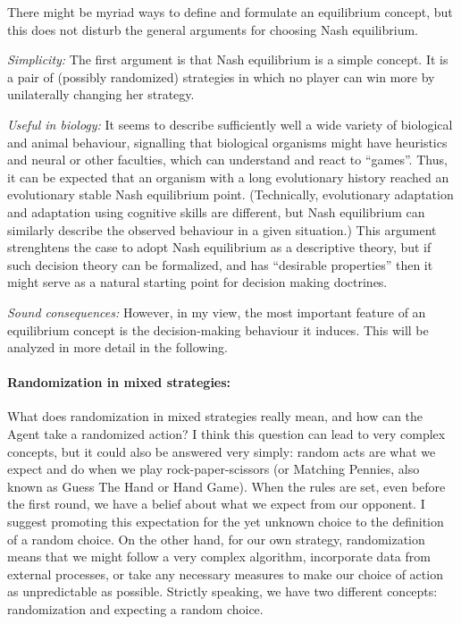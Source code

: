 \documentclass{article}
\begin{document}
There might be myriad ways to define and formulate an equilibrium concept, but this does not disturb the general arguments for choosing Nash equilibrium.

{\it Simplicity:}
The first argument is that Nash equilibrium is a simple concept. It is a pair of (possibly randomized) strategies in which no player can win more by unilaterally changing her strategy.

{\it Useful in biology:}
It seems to describe sufficiently well a wide variety of biological and animal behaviour, signalling that biological organisms might have heuristics and neural or other faculties, which can understand and react to ``games''. Thus, it can be expected that an organism with a long evolutionary history reached an evolutionary stable Nash equilibrium point. (Technically, evolutionary adaptation and adaptation using cognitive skills are different, but Nash equilibrium can similarly describe the observed behaviour in a given situation.)
This argument strenghtens the case to adopt Nash equilibrium as a descriptive theory, but if such decision theory can be formalized, and has ``desirable properties'' then it might serve as a natural starting point for decision making doctrines.

{\it Sound consequences:}
However, in my view, the most important feature of an equilibrium concept is the decision-making behaviour it induces. This will be analyzed in more detail in the following.

\paragraph{Randomization in mixed strategies:}
What does randomization in mixed strategies really mean, and how can the Agent take a randomized action?
I think this question can lead to very complex concepts, but it could also be answered very simply: random acts are what we expect and do when we play rock-paper-scissors (or Matching Pennies, also known as Guess The Hand or Hand Game).
When the rules are set, even before the first round, we have a belief about what we expect from our opponent. I suggest promoting this expectation for the yet unknown choice to the definition of a random choice.
On the other hand, for our own strategy, randomization means that we might follow a very complex algorithm, incorporate data from external processes, or take any necessary measures to make our choice of action as unpredictable as possible.
Strictly speaking, we have two different concepts: randomization and expecting a random choice.
\end{document}
